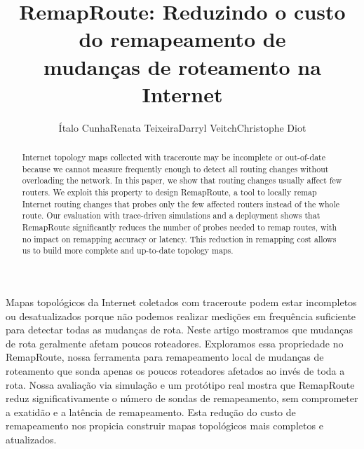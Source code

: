 \documentclass[12pt]{article}
\title{RemapRoute: Reduzindo o custo do remapeamento de\\
mudanças de roteamento na Internet}
\author{\'{I}talo Cunha\inst{1}\qquad Renata Teixeira\inst{2}\qquad Darryl
Veitch\inst{3}\qquad Christophe Diot\inst{4}}
\newcommand{\rmprt}{{Re\-map\-Rou\-te}}
\begin{document}
 

\maketitle


\begin{abstract}
%
Internet topology maps collected with traceroute may be incomplete or
out-of-date because we cannot measure frequently enough to detect all
routing changes without overloading the network.  In this paper, we show
that routing changes usually affect few routers.  We exploit this
property to design \rmprt{}, a tool to locally remap Internet routing
changes that probes only the few affected routers instead of the whole
route.  Our evaluation with trace-driven simulations and a deployment
shows that \rmprt{} significantly reduces the number of probes needed to
remap routes, with no impact on remapping accuracy or latency.  This
reduction in remapping cost allows us to build more complete and
up-to-date topology maps.
%
\end{abstract}

     
\begin{resumo} 
%
Mapas topológicos da Internet coletados com traceroute podem estar
incompletos ou desatualizados porque não podemos realizar medições em
frequência suficiente para detectar todas as mudanças de rota.  Neste
artigo mostramos que mudanças de rota geralmente afetam poucos
roteadores.  Exploramos essa propriedade no \rmprt{}, nossa ferramenta
para remapeamento local de mudanças de roteamento que sonda apenas os
poucos roteadores afetados ao invés de toda a rota.  Nossa avaliação via
simulação e um protótipo real mostra que \rmprt{} reduz
significativamente o número de sondas de remapeamento, sem comprometer a
exatidão e a latência de remapeamento.  Esta redução do custo de
remapeamento nos propicia construir mapas topológicos mais completos e
atualizados.
%
\end{resumo}



















\end{document}
